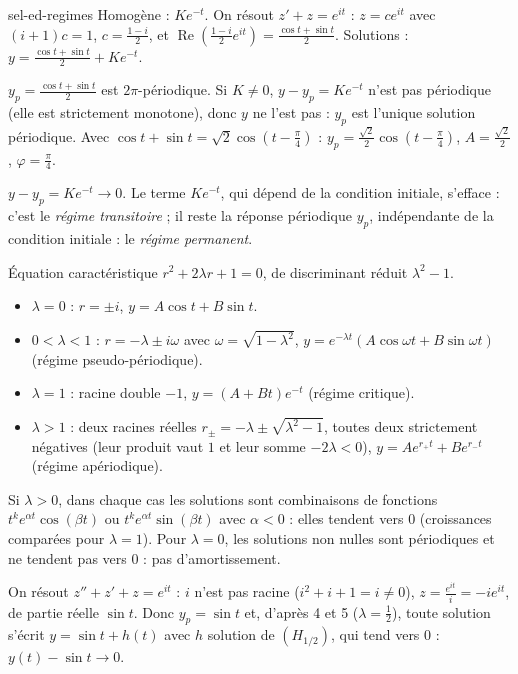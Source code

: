 \begin{corrige}{sel-ed-regimes}
 Homogène : $Ke^{-t}$. On résout $z'+z=e^{it}$ : $z=ce^{it}$ avec $(i+1)c=1$, $c=\frac{1-i}2$, et
$\operatorname{Re}\left(\frac{1-i}2e^{it}\right)=\frac{\cos t+\sin t}2$. Solutions : $y=\frac{\cos t+\sin t}2+Ke^{-t}$.

 $y_p=\frac{\cos t+\sin t}2$ est $2\pi$-périodique. Si $K\neq0$, $y-y_p=Ke^{-t}$ n'est pas périodique (elle est strictement monotone), donc $y$ ne l'est pas : $y_p$ est l'unique solution périodique. Avec $\cos t+\sin t=\sqrt2\cos\left(t-\frac\pi4\right)$ : $y_p=\frac{\sqrt2}2\cos\left(t-\frac\pi4\right)$, $A=\frac{\sqrt2}2$, $\varphi=\frac\pi4$.

 $y-y_p=Ke^{-t}\to0$. Le terme $Ke^{-t}$, qui dépend de la condition initiale, s'efface : c'est le \emph{régime transitoire} ; il reste la réponse périodique $y_p$, indépendante de la condition initiale : le \emph{régime permanent}.

 Équation caractéristique $r^2+2\lambda r+1=0$, de discriminant réduit $\lambda^2-1$.
\begin{itemize}
\item $\lambda=0$ : $r=\pm i$, $y=A\cos t+B\sin t$.
\item $0<\lambda<1$ : $r=-\lambda\pm i\omega$ avec $\omega=\sqrt{1-\lambda^2}$, $y=e^{-\lambda t}(A\cos\omega t+B\sin\omega t)$ (régime pseudo-périodique).
\item $\lambda=1$ : racine double $-1$, $y=(A+Bt)e^{-t}$ (régime critique).
\item $\lambda>1$ : deux racines réelles $r_\pm=-\lambda\pm\sqrt{\lambda^2-1}$, toutes deux strictement négatives (leur produit vaut $1$ et leur somme $-2\lambda<0$), $y=Ae^{r_+t}+Be^{r_-t}$ (régime apériodique).
\end{itemize}

 Si $\lambda>0$, dans chaque cas les solutions sont combinaisons de fonctions $t^ke^{\alpha t}\cos(\beta t)$ ou $t^ke^{\alpha t}\sin(\beta t)$ avec $\alpha<0$ : elles tendent vers $0$ (croissances comparées pour $\lambda=1$). Pour $\lambda=0$, les solutions non nulles sont périodiques et ne tendent pas vers $0$ : pas d'amortissement.

 On résout $z''+z'+z=e^{it}$ : $i$ n'est pas racine ($i^2+i+1=i\neq0$), $z=\frac{e^{it}}i=-ie^{it}$, de partie réelle $\sin t$. Donc $y_p=\sin t$ et, d'après 4 et 5 ($\lambda=\frac12$), toute solution s'écrit $y=\sin t+h(t)$ avec $h$ solution de $(H_{1/2})$, qui tend vers $0$ : $y(t)-\sin t\to0$.
\end{corrige}


